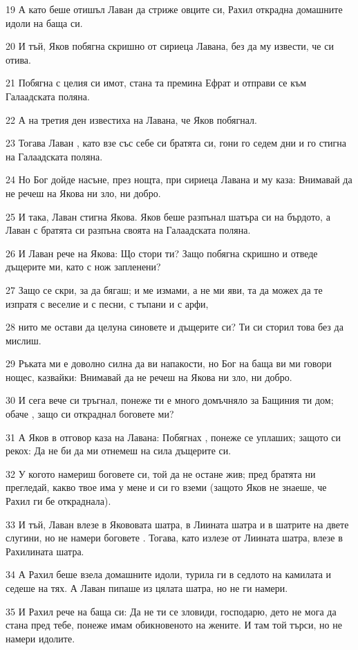 \par 19 А като беше отишъл Лаван да стриже овците си, Рахил открадна домашните идоли на баща си.
\par 20 И тъй, Яков побягна скришно от сириеца Лавана, без да му извести, че си отива.
\par 21 Побягна с целия си имот, стана та премина Ефрат и отправи се към Галаадската поляна.
\par 22 А на третия ден известиха на Лавана, че Яков побягнал.
\par 23 Тогава Лаван , като взе със себе си братята си, гони го седем дни и го стигна на Галаадската поляна.
\par 24 Но Бог дойде насъне, през нощта, при сириеца Лавана и му каза: Внимавай да не речеш на Якова ни зло, ни добро.
\par 25 И така, Лаван стигна Якова. Яков беше разпънал шатъра си на бърдото, а Лаван с братята си разпъна своята на Галаадската поляна.
\par 26 И Лаван рече на Якова: Що стори ти? Защо побягна скришно и отведе дъщерите ми, като с нож запленени?
\par 27 Защо се скри, за да бягаш; и ме измами, а не ми яви, та да можех да те изпратя с веселие и с песни, с тъпани и с арфи,
\par 28 нито ме остави да целуна синовете и дъщерите си? Ти си сторил това без да мислиш.
\par 29 Ръката ми е доволно силна да ви напакости, но Бог на баща ви ми говори нощес, казвайки: Внимавай да не речеш на Якова ни зло, ни добро.
\par 30 И сега вече си тръгнал, понеже ти е много домъчняло за Бащиния ти дом; обаче , защо си откраднал боговете ми?
\par 31 А Яков в отговор каза на Лавана: Побягнах , понеже се уплаших; защото си рекох: Да не би да ми отнемеш на сила дъщерите си.
\par 32 У когото намериш боговете си, той да не остане жив; пред братята ни прегледай, какво твое има у мене и си го вземи (защото Яков не знаеше, че Рахил ги бе откраднала).
\par 33 И тъй, Лаван влезе в Якововата шатра, в Лиината шатра и в шатрите на двете слугини, но не намери боговете . Тогава, като излезе от Лиината шатра, влезе в Рахилината шатра.
\par 34 А Рахил беше взела домашните идоли, турила ги в седлото на камилата и седеше на тях. А Лаван пипаше из цялата шатра, но не ги намери.
\par 35 И Рахил рече на баща си: Да не ти се зловиди, господарю, дето не мога да стана пред тебе, понеже имам обикновеното на жените. И там той търси, но не намери идолите.

